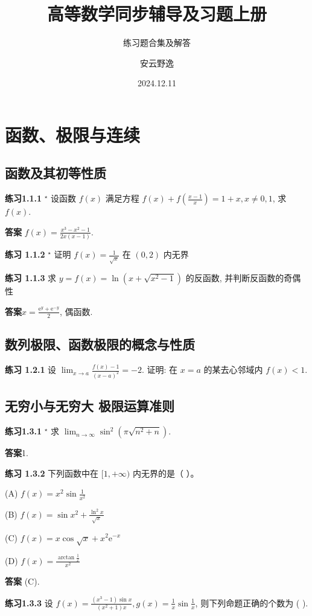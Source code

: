 \documentclass[lang=cn,10pt]{elegantbook}
\title{高等数学同步辅导及习题上册}
\subtitle{练习题合集及解答}
\author{安云野逸}
\institute{清疏大学}
\date{2024.12.11}
\begin{document}
\maketitle
\frontmatter

\tableofcontents

\mainmatter

\chapter{函数、极限与连续}


\section{函数及其初等性质}
\textbf{练习1.1.1 } ${ }^{\star}$ 设函数 $f(x)$ 满足方程 $f(x)+f\left(\frac{x-1}{x}\right)=1+x, x \neq 0,1$, 求 $f(x)$.

\textbf{答案} $f(x)=\frac{x^3-x^2-1}{2 x(x-1)}$.


\textbf{练习 1.1.2} ${ }^{\star}$ 证明 $f(x)=\frac{1}{\sqrt{x}}$ 在 $(0,2)$ 内无界


\textbf{练习 1.1.3 }求 $y=f(x)=\ln \left(x+\sqrt{x^2-1}\right)$ 的反函数, 并判断反函数的奇偶性

\textbf{答案}$x=\frac{\mathrm{e}^y+\mathrm{e}^{-y}}{2}$, 偶函数.
\section{数列极限、函数极限的概念与性质}
\textbf{练习 1.2.1 }设 $\lim _{x \rightarrow a} \frac{f(x)-1}{(x-a)^2}=-2$. 证明: 在 $x=a$ 的某去心邻域内 $f(x)<1$.
\section{无穷小与无穷大 极限运算准则}
\textbf{练习1.3.1} ${ }^{\star}$ 求 $\lim _{n \rightarrow \infty} \sin ^2\left(\pi \sqrt{n^2+n}\right)$.

\textbf{答案}1.


\textbf{练习 1.3.2} 下列函数中在 $[1,+\infty)$ 内无界的是（ ）。


(A) $f(x)=x^2 \sin \frac{1}{x^2}$

(B) $f(x)=\sin x^2+\frac{\ln ^2 x}{\sqrt{x}}$

(C) $f(x)=x \cos \sqrt{x}+x^2 \mathrm{e}^{-x}$

(D) $f(x)=\frac{\arctan \frac{1}{x}}{x^2}$

\textbf{答案} (C).


\textbf{练习1.3.3} 设 $f(x)=\frac{\left(x^3-1\right) \sin x}{\left(x^2+1\right) x}, g(x)=\frac{1}{x} \sin \frac{1}{x}$, 则下列命题正确的个数为 ( ).
\end{document}
